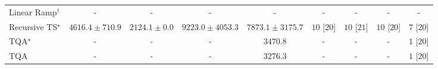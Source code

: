 \begin{tabular}{l|cccc|cccc|}
Linear Ramp$^\dagger$ & {\cellcolor[HTML]{000000}} \color[HTML]{F1F1F1} {\cellcolor{white}} \color{black} - & {\cellcolor[HTML]{000000}} \color[HTML]{F1F1F1} {\cellcolor{white}} \color{black} - & {\cellcolor[HTML]{000000}} \color[HTML]{F1F1F1} {\cellcolor{white}} \color{black} - & {\cellcolor[HTML]{000000}} \color[HTML]{F1F1F1} {\cellcolor{white}} \color{black} - & {\cellcolor[HTML]{000000}} \color[HTML]{F1F1F1} {\cellcolor{white}} \color{black} - & {\cellcolor[HTML]{000000}} \color[HTML]{F1F1F1} {\cellcolor{white}} \color{black} - & {\cellcolor[HTML]{000000}} \color[HTML]{F1F1F1} {\cellcolor{white}} \color{black} - & {\cellcolor[HTML]{000000}} \color[HTML]{F1F1F1} {\cellcolor{white}} \color{black} - \\
Recursive TS$^\star$ & {\cellcolor[HTML]{9FBAD9}} \color[HTML]{000000} $4616.4\pm 710.9$ & {\cellcolor[HTML]{F5EEF6}} \color[HTML]{000000} $2124.1\pm 0.0$ & {\cellcolor[HTML]{023A5B}} \color[HTML]{F1F1F1} $9223.0\pm 4053.3$ & {\cellcolor[HTML]{04649E}} \color[HTML]{F1F1F1} $7873.1\pm 3175.7$ & {\cellcolor[HTML]{49006A}} \color[HTML]{F1F1F1} $10$ [$20$] & {\cellcolor[HTML]{49006A}} \color[HTML]{F1F1F1} $10$ [$21$] & {\cellcolor[HTML]{49006A}} \color[HTML]{F1F1F1} $10$ [$20$] & {\cellcolor[HTML]{CD238F}} \color[HTML]{F1F1F1} $7$ [$20$] \\
TQA$^\star$ & {\cellcolor[HTML]{000000}} \color[HTML]{F1F1F1} {\cellcolor{white}} \color{black} - & {\cellcolor[HTML]{000000}} \color[HTML]{F1F1F1} {\cellcolor{white}} \color{black} - & {\cellcolor[HTML]{000000}} \color[HTML]{F1F1F1} {\cellcolor{white}} \color{black} - & {\cellcolor[HTML]{D2D3E7}} \color[HTML]{000000} $3470.8$ & {\cellcolor[HTML]{000000}} \color[HTML]{F1F1F1} {\cellcolor{white}} \color{black} - & {\cellcolor[HTML]{000000}} \color[HTML]{F1F1F1} {\cellcolor{white}} \color{black} - & {\cellcolor[HTML]{000000}} \color[HTML]{F1F1F1} {\cellcolor{white}} \color{black} - & {\cellcolor[HTML]{FFF7F3}} \color[HTML]{000000} $1$ [$20$] \\
TQA & {\cellcolor[HTML]{000000}} \color[HTML]{F1F1F1} {\cellcolor{white}} \color{black} - & {\cellcolor[HTML]{000000}} \color[HTML]{F1F1F1} {\cellcolor{white}} \color{black} - & {\cellcolor[HTML]{000000}} \color[HTML]{F1F1F1} {\cellcolor{white}} \color{black} - & {\cellcolor[HTML]{D8D7E9}} \color[HTML]{000000} $3276.3$ & {\cellcolor[HTML]{000000}} \color[HTML]{F1F1F1} {\cellcolor{white}} \color{black} - & {\cellcolor[HTML]{000000}} \color[HTML]{F1F1F1} {\cellcolor{white}} \color{black} - & {\cellcolor[HTML]{000000}} \color[HTML]{F1F1F1} {\cellcolor{white}} \color{black} - & {\cellcolor[HTML]{FFF7F3}} \color[HTML]{000000} $1$ [$20$] \\

\end{tabular}
